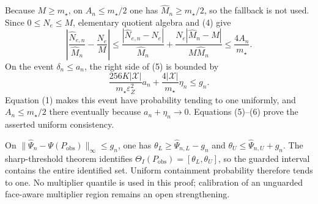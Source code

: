 Because \(M\ge m_{\star}\), on \(A_n\le m_{\star}/2\) one has \(\widehat M_n\ge m_{\star}/2\), so the fallback is not used.  Since \(0\le N_e\le M\), elementary quotient algebra and (4) give
\[
\left|\frac{\widehat N_{e,n}}{\widehat M_n}-\frac{N_e}{M}\right|
\le\frac{|\widehat N_{e,n}-N_e|}{\widehat M_n}
+\frac{N_e|\widehat M_n-M|}{M\widehat M_n}
\le\frac{4A_n}{m_{\star}}.
\tag{5}
\]
On the event \(\delta_n\le a_n\), the right side of (5) is bounded by
\[
\frac{256K|\mathcal X|}{m_{\star}\varepsilon_Z^2}a_n
+\frac{4|\mathcal X|}{m_{\star}}\eta_n
\le g_n.
\tag{6}
\]
Equation (1) makes this event have probability tending to one uniformly, and \(A_n\le m_{\star}/2\) there eventually because \(a_n+\eta_n\to0\).  Equations (5)--(6) prove the asserted uniform consistency.

On \(\|\widehat\Psi_n-\Psi(P_{\mathrm{obs}})\|_\infty\le g_n\), one has \(\theta_L\ge\widehat\Psi_{n,L}-g_n\) and \(\theta_U\le\widehat\Psi_{n,U}+g_n\).  The sharp-threshold theorem identifies \(\Theta_I(P_{\mathrm{obs}})=[\theta_L,\theta_U]\), so the guarded interval contains the entire identified set.  Uniform containment probability therefore tends to one.  No multiplier quantile is used in this proof; calibration of an unguarded face-aware multiplier region remains an open strengthening.